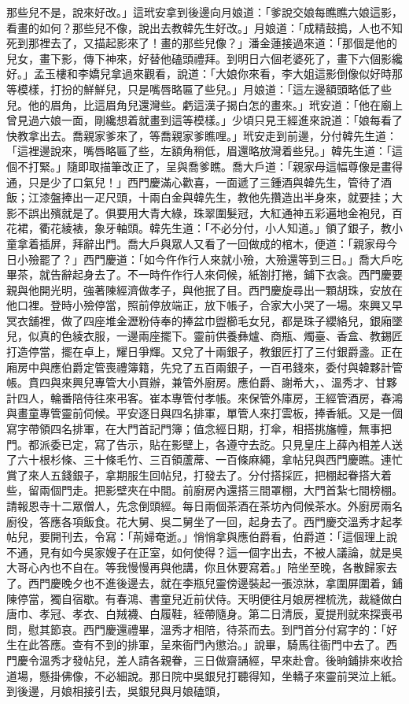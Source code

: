 那些兒不是，說來好改。」這玳安拿到後邊向月娘道：「爹說交娘每瞧瞧六娘這影，看畫的如何？那些兒不像，說出去教韓先生好改。」月娘道：「成精鼓搗，人也不知死到那裡去了，又描起影來了！畫的那些兒像？」潘金蓮接過來道：「那個是他的兒女，畫下影，傳下神來，好替他磕頭禮拜。到明日六個老婆死了，畫下六個影纔好。」孟玉樓和李嬌兒拿過來觀看，說道：「大娘你來看，李大姐這影倒像似好時那等模樣，打扮的鮮鮮兒，只是嘴唇略匾了些兒。」月娘道：「這左邊額頭略低了些兒。他的眉角，比這眉角兒還灣些。虧這漢子揭白怎的畫來。」玳安道：「他在廟上曾見過六娘一面，剛纔想着就畫到這等模樣。」少頃只見王經進來說道：「娘每看了快教拿出去。喬親家爹來了，等喬親家爹瞧哩。」玳安走到前邊，分付韓先生道：「這裡邊說來，嘴唇略匾了些，左額角稍低，眉還略放灣着些兒。」韓先生道：「這個不打緊。」隨即取描筆改正了，呈與喬爹瞧。喬大戶道：「親家母這幅尊像是畫得通，只是少了口氣兒！」西門慶滿心歡喜，一面遞了三鍾酒與韓先生，管待了酒飯；江漆盤捧出一疋尺頭，十兩白金與韓先生，教他先攢造出半身來，就要挂；大影不誤出殯就是了。俱要用大青大綠，珠翠圍髮冠，大紅通神五彩遍地金袍兒，百花裙，衢花綾裱，象牙軸頭。韓先生道：「不必分付，小人知道。」領了銀子，教小童拿着插屏，拜辭出門。喬大戶與眾人又看了一回做成的棺木，便道：「親家母今日小殮罷了？」西門慶道：「如今仵作行人來就小殮，大殮還等到三日。」喬大戶吃畢茶，就告辭起身去了。不一時仵作行人來伺候，紙劄打捲，鋪下衣衾。西門慶要親與他開光明，強著陳經濟做孝子，與他抿了目。西門慶旋尋出一顆胡珠，安放在他口裡。登時小殮停當，照前停放端正，放下帳子，合家大小哭了一場。來興又早冥衣舖裡，做了四座堆金瀝粉侍奉的捧盆巾盥櫛毛女兒，都是珠子纓絡兒，銀廂墜兒，似真的色綾衣服，一邊兩座擺下。靈前供養彝爐、商瓶、燭臺、香盒、教錫匠打造停當，擺在卓上，耀日爭輝。又兌了十兩銀子，教銀匠打了三付銀爵盞。正在廂房中與應伯爵定管喪禮簿籍，先兌了五百兩銀子，一百弔錢來，委付與韓夥計管帳。賁四與來興兒專管大小買辦，兼管外廚房。應伯爵、謝希大，、溫秀才、甘夥計四人，輪番陪侍往來弔客。崔本專管付孝帳。來保管外庫房，王經管酒房，春鴻與畫童專管靈前伺候。平安逐日與四名排軍，單管人來打雲板，捧香紙。又是一個寫字帶領四名排軍，在大門首記門簿；值念經日期，打傘，相搭挑旛幢，無事把門。都派委已定，寫了告示，貼在影壁上，各遵守去訖。只見皇庄上薛內相差人送了六十根杉條、三十條毛竹、三百領蘆蓆、一百條麻繩，拿帖兒與西門慶瞧。連忙賞了來人五錢銀子，拿期服生回帖兒，打發去了。分付搭採匠，把棚起眷搭大着些，留兩個門走。把影壁夾在中間。前廚房內還搭三間罩棚，大門首紮七間榜棚。請報恩寺十二眾僧人，先念倒頭經。每日兩個茶酒在茶坊內伺候茶水。外廚房兩名廚役，答應各項飯食。花大舅、吳二舅坐了一回，起身去了。西門慶交溫秀才起孝帖兒，要開刊去，令寫：「荊婦奄逝。」悄悄拿與應伯爵看，伯爵道：「這個理上說不通，見有如今吳家嫂子在正室，如何使得？這一個字出去，不被人議論，就是吳大哥心內也不自在。等我慢慢再與他講，你且休要寫着。」陪坐至晚，各散歸家去了。西門慶晚夕也不進後邊去，就在李瓶兒靈傍邊裝起一張涼牀，拿圍屏圍着，鋪陳停當，獨自宿歇。有春鴻、書童兒近前伏侍。天明便往月娘房裡梳洗，裁縫做白唐巾、孝冠、孝衣、白羢襪、白履鞋，絰帶隨身。第二日清辰，夏提刑就來探喪弔問，慰其節哀。西門慶還禮畢，溫秀才相陪，待茶而去。到門首分付寫字的：「好生在此答應。查有不到的排軍，呈來衙門內懲治。」說畢，騎馬往衙門中去了。西門慶令溫秀才發帖兒，差人請各親眷，三日做齋誦經，早來赴會。後晌鋪排來收拾道場，懸掛佛像，不必細說。那日院中吳銀兒打聽得知，坐轎子來靈前哭泣上紙。到後邊，月娘相接引去，吳銀兒與月娘磕頭，